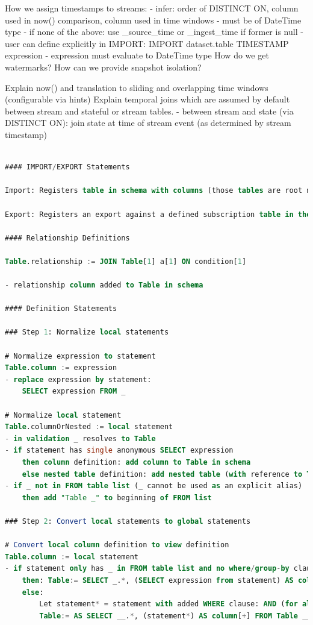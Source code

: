 \documentclass[	DIV=calc,%
							paper=letter,%
							fontsize=11pt,%
							twocolumn]{scrartcl}	 					%
\begin{document}
How we assign timestamps to streams:
    - infer: order of DISTINCT ON, column used in now() comparison, column used in time windows
        - must be of DateTime type
    - if none of the above: use \_source\_time or \_ingest\_time if former is null
    - user can define explicitly in IMPORT: IMPORT dataset.table TIMESTAMP expression
        - expression must evaluate to DateTime type
How do we get watermarks?
How can we provide snapshot isolation?

Explain now() and translation to sliding and overlapping time windows (configurable via hints)
Explain temporal joins which are assumed by default between stream and stateful or stream tables.
    - between stream and state (via DISTINCT ON): join state at time of stream event (as determined by stream timestamp)


\begin{lstlisting}[language=SQL]

#### IMPORT/EXPORT Statements

Import: Registers table in schema with columns (those tables are root nodes in the logical plan DAG)

Export: Registers an export against a defined subscription table in the schema

#### Relationship Definitions

Table.relationship := JOIN Table[1] a[1] ON condition[1]

- relationship column added to Table in schema

#### Definition Statements

### Step 1: Normalize local statements

# Normalize expression to statement
Table.column := expression
- replace expression by statement:
    SELECT expression FROM _

# Normalize local statement
Table.columnOrNested := local statement
- in validation _ resolves to Table
- if statement has single anonymous SELECT expression
    then column definition: add column to Table in schema
    else nested table definition: add nested table (with reference to Table) to schema with parent and child relationship columns and PK = Table PK + local PK for nested table (see below)
- if _ not in FROM table list (_ cannot be used as an explicit alias)
    then add "Table _" to beginning of FROM list

### Step 2: Convert local statements to global statements

# Convert local column definition to view definition
Table.column := local statement
- if statement only has _ in FROM table list and no where/group-by clause
    then: Table:= SELECT _.*, (SELECT expression from statement) AS column[+] FROM Table _
    else:
        Let statement* = statement with added WHERE clause: AND (for all PK columns pk of Table: _.pk = __.pk)
        Table:= AS SELECT __.*, (statement*) AS column[+] FROM Table __


\end{lstlisting}
\end{document}
